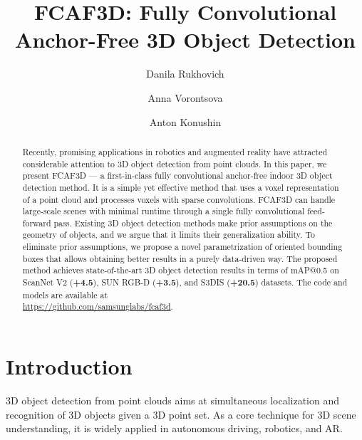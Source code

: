 \documentclass[runningheads]{llncs}
\begin{document}
\pagestyle{headings}
\mainmatter
\def\ECCVSubNumber{6356}  

\title{FCAF3D: Fully Convolutional Anchor-Free 3D Object Detection} 





\author{Danila Rukhovich\and
Anna Vorontsova\and
Anton Konushin}




\maketitle

\begin{abstract}
Recently, promising applications in robotics and augmented reality have attracted considerable attention to 3D object detection from point clouds. In this paper, we present FCAF3D --- a first-in-class fully convolutional anchor-free indoor 3D object detection method. It is a simple yet effective method that uses a voxel representation of a point cloud and processes voxels with sparse convolutions. FCAF3D can handle large-scale scenes with minimal runtime through a single fully convolutional feed-forward pass. Existing 3D object detection methods make prior assumptions on the geometry of objects, and we argue that it limits their generalization ability. To eliminate prior assumptions, we propose a novel parametrization of oriented bounding boxes that allows obtaining better results in a purely data-driven way. The proposed method achieves state-of-the-art 3D object detection results in terms of mAP@0.5 on ScanNet V2 (\textbf{+4.5}), SUN RGB-D (\textbf{+3.5}), and S3DIS (\textbf{+20.5}) datasets. The code and models are available at \\\url{https://github.com/samsunglabs/fcaf3d}.

\end{abstract}

\section{Introduction}

3D object detection from point clouds aims at simultaneous localization and recognition of 3D objects given a 3D point set. As a core technique for 3D scene understanding, it is widely applied in autonomous driving, robotics, and AR.
\end{document}
